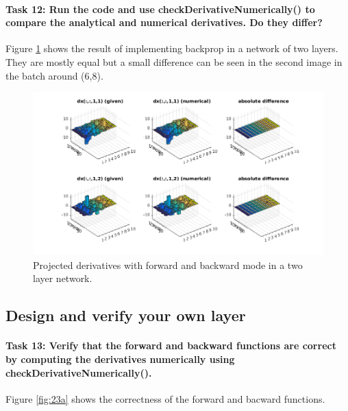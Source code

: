 \documentclass[12pt]{article}
\begin{document}
\paragraph{Task 12: Run the code and use checkDerivativeNumerically() to compare the analytical and numerical derivatives. Do they differ?} Figure \ref{fig:22a} shows the result of implementing backprop in a network of two layers. They are mostly equal but a small difference can be seen in the second image in the batch around (6,8).
\begin{figure}[htbp]
 \centering
\includegraphics[width=\textwidth]{22a}
\caption{Projected derivatives with forward and backward mode in a two layer network.}
 \label{fig:22a}
\end{figure}

\subsection{Design and verify your own layer}

\paragraph{Task 13: Verify that the forward and backward functions are correct by computing the derivatives numerically using checkDerivativeNumerically().} Figure \ref{fig:23a} shows the correctness of the forward and bacward functions.
\end{document}
